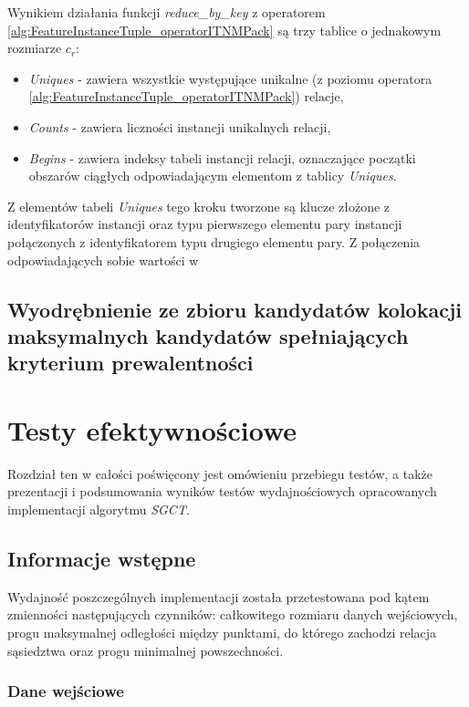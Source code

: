 \documentclass[12pt]{article}
\begin{document}
Wynikiem działania funkcji \textit{reduce\_by\_key} z operatorem \ref{alg:FeatureInstanceTuple_operatorITNMPack} są trzy tablice o jednakowym rozmiarze $ c_{r} $:
\begin{itemize}
\item \textit{Uniques} - zawiera wszystkie występujące unikalne (z poziomu operatora \ref{alg:FeatureInstanceTuple_operatorITNMPack}) relacje,
\item \textit{Counts} - zawiera liczności instancji unikalnych relacji,
\item \textit{Begins} - zawiera indeksy tabeli instancji relacji, oznaczające początki obszarów ciągłych odpowiadającym elementom z tablicy \textit{Uniques}.
\end{itemize}

Z elementów tabeli \textit{Uniques} tego kroku tworzone są klucze złożone z identyfikatorów instancji oraz typu pierwszego elementu pary instancji połączonych z identyfikatorem typu drugiego elementu pary. Z połączenia odpowiadających sobie wartości w 

\subsection{Wyodrębnienie ze zbioru kandydatów kolokacji maksymalnych kandydatów spełniających kryterium prewalentności}

\newpage

\section{Testy efektywnościowe}
\label{sec:tests}

Rozdział ten w całości poświęcony jest omówieniu przebiegu testów, a także prezentacji i podsumowania wyników testów wydajnościowych opracowanych implementacji algorytmu \textit{SGCT}. 

\subsection{Informacje wstępne}

Wydajność poszczególnych implementacji została przetestowana pod kątem zmienności następujących czynników: całkowitego rozmiaru danych wejściowych, progu maksymalnej odległości między punktami, do którego zachodzi relacja sąsiedztwa oraz progu minimalnej powszechności.

\subsubsection{Dane wejściowe}
\end{document}
